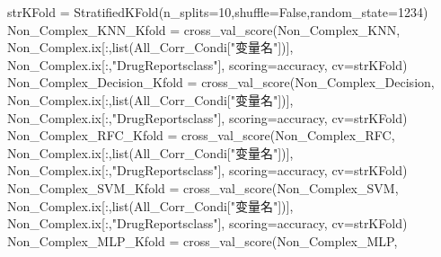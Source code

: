 \documentclass[
]{article}
\newenvironment{Shaded}{}{}
\newcommand{\BuiltInTok}[1]{#1}
\newcommand{\DecValTok}[1]{\textcolor[rgb]{0.25,0.63,0.44}{#1}}
\newcommand{\NormalTok}[1]{#1}
\newcommand{\OperatorTok}[1]{\textcolor[rgb]{0.40,0.40,0.40}{#1}}
\newcommand{\StringTok}[1]{\textcolor[rgb]{0.25,0.44,0.63}{#1}}
\newcommand{\VariableTok}[1]{\textcolor[rgb]{0.10,0.09,0.49}{#1}}
\begin{document}
\begin{Shaded}
\begin{Highlighting}[]
\NormalTok{strKFold }\OperatorTok{=}\NormalTok{ StratifiedKFold(n\_splits}\OperatorTok{=}\DecValTok{10}\NormalTok{,shuffle}\OperatorTok{=}\VariableTok{False}\NormalTok{,random\_state}\OperatorTok{=}\DecValTok{1234}\NormalTok{)}
\NormalTok{Non\_Complex\_KNN\_Kfold }\OperatorTok{=}\NormalTok{ cross\_val\_score(Non\_Complex\_KNN,}
\NormalTok{                            Non\_Complex.ix[:,}\BuiltInTok{list}\NormalTok{(All\_Corr\_Condi[}\StringTok{"变量名"}\NormalTok{])],}
\NormalTok{                            Non\_Complex.ix[:,}\StringTok{"DrugReportsclass"}\NormalTok{],}
\NormalTok{                            scoring}\OperatorTok{=}\StringTok{\textquotesingle{}accuracy\textquotesingle{}}\NormalTok{,}
\NormalTok{                            cv}\OperatorTok{=}\NormalTok{strKFold)}
\NormalTok{Non\_Complex\_Decision\_Kfold }\OperatorTok{=}\NormalTok{ cross\_val\_score(Non\_Complex\_Decision,}
\NormalTok{                            Non\_Complex.ix[:,}\BuiltInTok{list}\NormalTok{(All\_Corr\_Condi[}\StringTok{"变量名"}\NormalTok{])],}
\NormalTok{                            Non\_Complex.ix[:,}\StringTok{"DrugReportsclass"}\NormalTok{],}
\NormalTok{                            scoring}\OperatorTok{=}\StringTok{\textquotesingle{}accuracy\textquotesingle{}}\NormalTok{,}
\NormalTok{                            cv}\OperatorTok{=}\NormalTok{strKFold)}
\NormalTok{Non\_Complex\_RFC\_Kfold }\OperatorTok{=}\NormalTok{ cross\_val\_score(Non\_Complex\_RFC,}
\NormalTok{                            Non\_Complex.ix[:,}\BuiltInTok{list}\NormalTok{(All\_Corr\_Condi[}\StringTok{"变量名"}\NormalTok{])],}
\NormalTok{                            Non\_Complex.ix[:,}\StringTok{"DrugReportsclass"}\NormalTok{],}
\NormalTok{                            scoring}\OperatorTok{=}\StringTok{\textquotesingle{}accuracy\textquotesingle{}}\NormalTok{,}
\NormalTok{                            cv}\OperatorTok{=}\NormalTok{strKFold)}
\NormalTok{Non\_Complex\_SVM\_Kfold }\OperatorTok{=}\NormalTok{ cross\_val\_score(Non\_Complex\_SVM,}
\NormalTok{                            Non\_Complex.ix[:,}\BuiltInTok{list}\NormalTok{(All\_Corr\_Condi[}\StringTok{"变量名"}\NormalTok{])],}
\NormalTok{                            Non\_Complex.ix[:,}\StringTok{"DrugReportsclass"}\NormalTok{],}
\NormalTok{                            scoring}\OperatorTok{=}\StringTok{\textquotesingle{}accuracy\textquotesingle{}}\NormalTok{,}
\NormalTok{                            cv}\OperatorTok{=}\NormalTok{strKFold)}
\NormalTok{Non\_Complex\_MLP\_Kfold }\OperatorTok{=}\NormalTok{ cross\_val\_score(Non\_Complex\_MLP,}

\end{Highlighting}
\end{Shaded}
\end{document}
